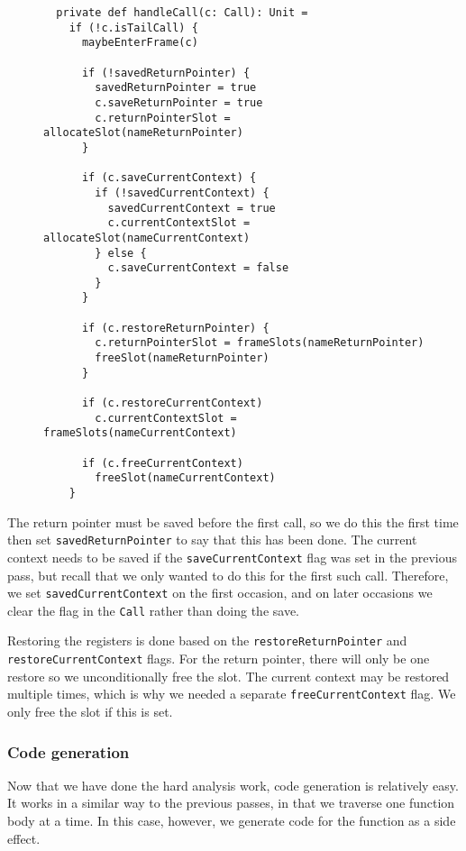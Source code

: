 \begin{figure}
\begin{verbatim}
  private def handleCall(c: Call): Unit =
    if (!c.isTailCall) {
      maybeEnterFrame(c)

      if (!savedReturnPointer) {
        savedReturnPointer = true
        c.saveReturnPointer = true
        c.returnPointerSlot = allocateSlot(nameReturnPointer)
      }

      if (c.saveCurrentContext) {
        if (!savedCurrentContext) {
          savedCurrentContext = true
          c.currentContextSlot = allocateSlot(nameCurrentContext)
        } else {
          c.saveCurrentContext = false
        }
      }

      if (c.restoreReturnPointer) {
        c.returnPointerSlot = frameSlots(nameReturnPointer)
        freeSlot(nameReturnPointer)
      }

      if (c.restoreCurrentContext)
        c.currentContextSlot = frameSlots(nameCurrentContext)

      if (c.freeCurrentContext)
        freeSlot(nameCurrentContext)
    }
\end{verbatim}
\getcaption
\end{figure}

The return pointer must be saved before the first call,
so we do this the first time
then set \verb!savedReturnPointer! to say that this has been done.
The current context needs to be saved if the \verb!saveCurrentContext!
flag was set in the previous pass,
but recall that we only wanted to do this for the first such call.
Therefore, we set \verb!savedCurrentContext! on the first occasion,
and on later occasions we clear the flag in the \verb!Call!
rather than doing the save.

Restoring the registers is done based on
the \verb!restoreReturnPointer! and \verb!restoreCurrentContext! flags.
For the return pointer,
there will only be one restore so we unconditionally free the slot.
The current context may be restored multiple times,
which is why we needed a separate \verb!freeCurrentContext! flag.
We only free the slot if this is set.


\subsubsection{Code generation\label{sec:codegen}}

Now that we have done the hard analysis work,
code generation is relatively easy.
It works in a similar way to the previous passes,
in that we traverse one function body at a time.
In this case, however, we generate code for the function as a side effect.

